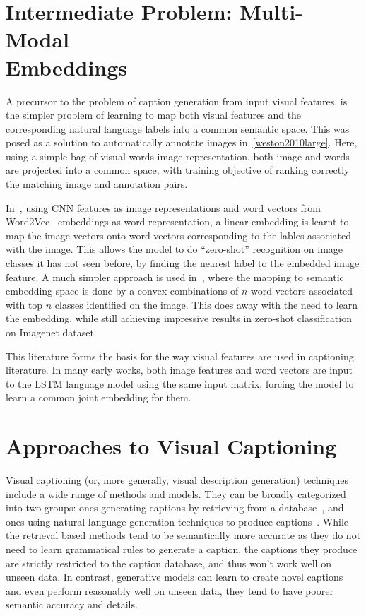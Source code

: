 \section{Intermediate Problem: Multi-Modal \\Embeddings}
A precursor to the problem of caption generation from input visual features, is
the simpler problem of learning to map both visual features and the
corresponding natural language labels into a common semantic space.
This was posed as a solution to automatically annotate images
in~\ref{weston2010large}.
Here, using a simple bag-of-visual words image representation, both image and
words are projected into a common space, with training objective of ranking
correctly the matching image and annotation pairs. 

In~\cite{frome2013devise}, using CNN features as image representations and
word vectors from Word2Vec~\cite{mikolov2013distributed} embeddings as word
representation, a linear embedding is learnt to map the image vectors onto
word vectors corresponding to the lables associated with the image.
This allows the model to do ``zero-shot'' recognition on image classes it has
not seen before, by finding the nearest label to the embedded image feature.
A much simpler approach is used in~\cite{norouzi2013zero}, where the mapping to
semantic embedding space is done by a convex combinations of $n$ word vectors
associated with top $n$ classes identified on the image.
This does away with the need to learn the embedding, while still achieving
impressive results in zero-shot classification on Imagenet dataset

This literature forms the basis for the way visual features are used in
captioning literature.
In many early works, both image features and word vectors are input to the LSTM
language model using the same input matrix, forcing the model to learn a common
joint embedding for them.

\section{Approaches to Visual Captioning}
Visual captioning (or, more generally, visual description generation)
techniques include a wide range of methods and models.
They can be broadly categorized into two groups: ones generating captions by
retrieving from a database~\cite{Farhadi2010, Hodosh2013,Karpathy2014},
and ones using natural language generation techniques to produce
captions~\cite{Li2011,kulkarni2013babytalk,Vinyals_2015_CVPR,Fang2015}.
While the retrieval based methods tend to be semantically more accurate as they
do not need to learn grammatical rules to generate a caption, the captions they
produce are strictly restricted to the caption database, and thus won't work
well on unseen data.
In contrast, generative models can learn to create novel captions and even
perform reasonably well on unseen data, they tend to have poorer semantic
accuracy and details.

